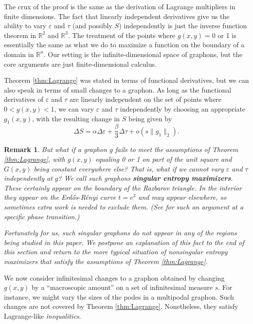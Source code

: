 \documentclass[12pt]{amsart}
\newtheorem{remark}[lemma]{Remark}
\newcommand\be{\begin{equation}}
\newcommand\ee{\end{equation}}
\newcommand{\tdens}{\tau}
\newcommand{\edens}{\varepsilon}
\newcommand{\ER}{Erd\H{o}s-R\'enyi}
\newcommand{\R}{\mathbb{R}}
\begin{document}
{The crux of the proof is the same as the derivation of Lagrange multipliers in finite dimensions. The fact that 
linearly independent derivatives give us the ability to vary $\edens$ and $\tdens$ (and possibly $S$) independently
is just the inverse function theorem in $\R^2$ and $\R^3$. The treatment of the points where $g(x,y)=0$ or 1 is
essentially the same as what we do to maximize a function on the boundary of a domain in $\R^n$. Our setting is the 
infinite-dimensional space of graphons, but the core arguments are just finite-dimensional calculus. 

Theorem \ref{thm:Lagrange} was stated in terms of functional derivatives, but we can also 
speak in terms of small changes to a graphon. As long as the 
functional derivatives of $\edens$ and $\tdens$ are linearly independent on the set of points where $0<g(x,y)<1$, 
we can vary $\edens$ and $\tdens$
independently by choosing an appropriate $g_1(x,y)$, with the resulting change in $S$ being given by 
\be \label{eq:DeltaS} \Delta S = \alpha \Delta \edens + \frac{\beta}{3} \Delta \tdens + 
o(s\|g_1\|_2). \ee

\begin{remark}
But what if a graphon $g$ fails to meet the assumptions of Theorem \ref{thm:Lagrange}, with $g(x,y)$ equaling 0 or 1 on part of the unit square and $G(x,y)$ being constant everywhere else? That is, what if we cannot vary $\edens$
and $\tdens$ independently at $g$?
We call such graphons {\bf singular entropy maximizers}. 
These certainly appear on the boundary of the Razbarov triangle. In the interior they appear on 
the \ER{} curve $t=e^3$ and may appear elsewhere, 
so sometimes extra work is needed to exclude them. 
(See \cite[Theorem 4.1]{KRRS1} for such an argument at a specific phase transition.) 

Fortunately for us, such singular graphons do not appear in any of the regions being studied in this paper. 
We postpone 
an explanation of this fact to the end of this section and return to the more typical situation of 
{\em nonsingular} entropy maximizers that satisfy the assumptions of Theorem \ref{thm:Lagrange}. 
\end{remark}

We now consider infinitesimal changes to a graphon obtained by changing $g(x,y)$ by a ``macroscopic 
amount'' on a set of infinitesimal measure $s$.  For instance, we might vary the sizes of the podes in 
a multipodal graphon. Such changes are not covered by Theorem \ref{thm:Lagrange}. 
Nonetheless, they satisfy Lagrange-like {\em inequalities}. 

}
\end{document}
